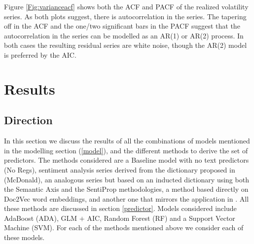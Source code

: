 \documentclass[a4paper, 12pt]{report}
\begin{document}
    
        
    
    Figure \ref{Fig:varianceacf} shows both the ACF and PACF of the realized volatility series. As both plots suggest, there is autocorrelation in the series. The tapering off in the ACF and the one/two significant bars in the PACF suggest that the autocorrelation in the series can be modelled as an AR(1) or AR(2) process. In both cases the resulting residual series are white noise, though the AR(2) model is preferred by the AIC. 

    
    
   
    
 
    
    \newpage
    \chapter{Results}
    \section{Direction}
    \label{Sec:Dir}
    In this section we discuss the results of all the combinations of models mentioned in the modelling section (\ref{model}), and the different methods to derive the set of predictors. The methods considered are a Baseline model with no text predictors (No Regs), sentiment analysis series derived from the dictionary proposed in \textcite{Loughran:2011} (McDonald), an analogous series but based on an inducted dictionary using both the Semantic Axis and the SentiProp methodologies, a method based directly on Doc2Vec word embeddings, and another one that mirrors the application in \textcite{Gupta:2020}. All these methods are discussed in section \ref{predictor}. Models considered include AdaBoost (ADA), GLM $+$ AIC, Random Forest (RF) and a Support Vector Machine (SVM). For each of the methods mentioned above we consider each of these models. 
    
\end{document}
